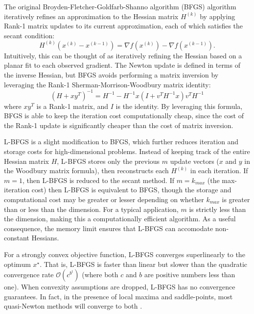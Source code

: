 \documentclass[conference]{ieeeconf}  %
\begin{document}
The original Broyden-Fletcher-Goldfarb-Shanno algorithm (BFGS)
algorithm iteratively refines an approximation to the Hessian matrix
$H^{(k)}$ by applying Rank-1 matrix updates to its current
approximation, each of which satisfies the secant condition:
$$ H^{(k)}\left(x^{(k)}-x^{(k-1)}\right) = \nabla f(x^{(k)}) - \nabla f(x^{(k-1)}).$$
Intuitively, this can be thought of as iteratively refining the
Hessian based on a planar fit to each observed gradient.  The Newton
update is defined in terms of the inverse Hessian, but BFGS avoids
performing a matrix inversion by leveraging the Rank-1
Sherman-Morrison-Woodbury matrix identity:
$$(H + xy^T)^{-1} = H^{-1} - H^{-1}x(I + v^T H^{-1}x)v^T H^{-1}$$
where $xy^T$ is a Rank-1 matrix, and $I$ is the identity.  By
leveraging this formula, BFGS is able to keep the iteration cost
computationally cheap, since the cost of the Rank-1 update is
significantly cheaper than the cost of matrix inversion.

L-BFGS \cite{nocedal1980updating,liu1989limited} is a slight
modification to BFGS, which further reduces iteration and storage
costs for high-dimensional problems.  Instead of keeping track of the
entire Hessian matrix $H$, L-BFGS stores only the previous $m$ update
vectors ($x$ and $y$ in the Woodbury matrix formula), then
reconstructs each $H^{(k)}$ in each iteration.  If $m=1$, then L-BFGS
is reduced to the secant method.  If $m=k_{max}$ (the max-iteration
cost) then L-BFGS is equivalent to BFGS, though the storage and
computational cost may be greater or lesser depending on whether
$k_{max}$ is greater than or less than the dimension.  For a typical
application, $m$ is strictly less than the dimension, making this a
computationally efficient algorithm.  As a useful consequence, the
memory limit ensures that L-BFGS can accomodate non-constant Hessians.

For a strongly convex objective function, L-BFGS converges
superlinearly to the optimum $x^\star$.  That is, L-BFGS is faster
than linear but slower than the quadratic convergence rate
$\mathcal{O}\left( c^{b^t} \right)$ (where both $c$ and $b$ are
positive numbers less than one).  When convexity assumptions are
dropped, L-BFGS has no convergence guarantees.  In fact, in the
presence of local maxima and saddle-points, most quasi-Newton methods
will converge to both \cite{dauphin2014identifying}.
\end{document}
